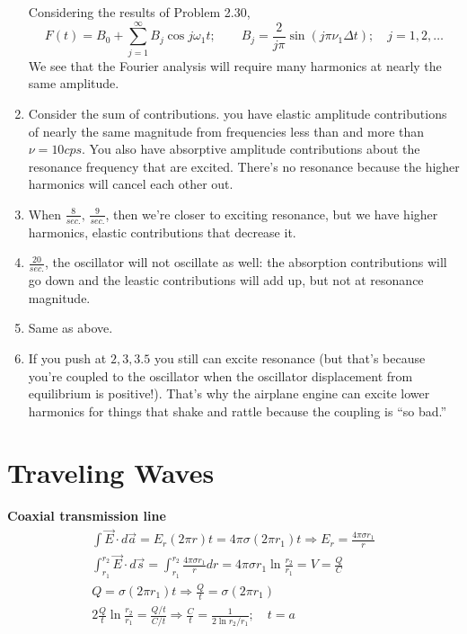 \documentclass[twoside,10pt]{amsart}
\newcommand{\problemhead}[1]
  {\smallskip
   \noindent{\large\bf Problem #1.}
   \smallskip}
\begin{document}
\begin{enumerate}
Considering the results of Problem 2.30, 
\[
F(t) = B_0 + \sum_{j=1}^{\infty} B_j \cos{ j \omega_1 t } ; \quad \quad B_j = \frac{2}{ j\pi} \sin{ (j \pi \nu_1 \Delta t) }; \quad j = 1 , 2, \dots 
\]
We see that the Fourier analysis will require many harmonics at nearly the same amplitude.  
  \item Consider the sum of contributions.  you have elastic amplitude contributions of nearly the same magnitude from frequencies less than and more than $\nu = 10 cps$.  You also have absorptive amplitude contributions about the resonance frequency that are excited.  There's no resonance because the higher harmonics will cancel each other out. 
  \item When $\frac{ 8 }{ sec. }, \, \frac{ 9 }{ sec. }$, then we're closer to exciting resonance, but we have higher harmonics, elastic contributions that decrease it.  
  \item $\frac{20}{ sec.}$, the oscillator will not oscillate as well: the absorption contributions will go down and the leastic contributions will add up, but not at resonance magnitude.  
  \item Same as above.
  \item If you push at $2,3,3.5$ you still can excite resonance (but that's because you're coupled to the oscillator when the oscillator displacement from equilibrium is positive!).  That's why the airplane engine can excite lower harmonics for things that shake and rattle because the coupling is ``so bad.''
\end{enumerate}

\section{ Traveling Waves }

\problemhead{4.7} \textbf{ Coaxial transmission line } 
\begin{gather*}
  \int \vec{E} \cdot d\vec{a} = E_r ( 2\pi r) t = 4 \pi \sigma (2\pi r_1) t \Longrightarrow E_r = \frac{ 4 \pi \sigma r_1}{r} \\
\int_{r_1}^{r_2} \vec{E} \cdot d\vec{s} = \int_{r_1}^{r_2} \frac{4 \pi \sigma r_1}{r} dr = 4 \pi \sigma r_1 \ln{ \frac{r_2}{r_1} } = V = \frac{Q}{C} \\
Q = \sigma (2\pi r_1 )t \Longrightarrow \frac{Q}{t} = \sigma ( 2 \pi r_1 ) \\
2 \frac{Q}{t} \ln{ \frac{r_2}{r_1} } = \frac{ Q/t}{C/t} \Longrightarrow \boxed{ \frac{C}{t} = \frac{1}{ 2 \ln{ r_2/r_1}}; \quad t = a }
\end{gather*}
\end{document}
